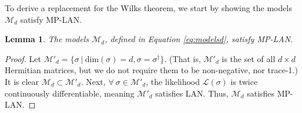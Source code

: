 \documentclass[aps,pra, twocolumn]{revtex4-1}
\newcommand{\M}{\mathcal{M}}
\newcommand{\cL}{\mathcal{L}}
\newtheorem{lem}{Lemma}
\begin{document}
To derive a replacement for the Wilks theorem, we start by showing  the models $\M_{d}$ satisfy MP-LAN.
\begin{lem}
The models $\M_{d}$, defined in Equation \eqref{eq:modelsd}, satisfy MP-LAN.
\end{lem}

\begin{proof} Let $\M'_{d} = \{\sigma ~|~\mathrm{dim}(\sigma) = d, \sigma = \sigma^{\dagger}\}$. (That is, $\M'_{d}$ is the set of all $d \times d$ Hermitian matrices, but we do not require them to be non-negative, nor trace-1.) It is clear $\M_{d} \subset \M'_{d}$. Next, $\forall ~\sigma \in \M'_{d}$, the likelihood $\cL(\sigma)$ is twice continuously differentiable, meaning $\M'_{d}$ satisfies LAN. Thus, $\M_{d}$ satisfies MP-LAN.
\end{proof}
\end{document}
